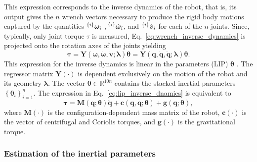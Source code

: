 This expression corresponds to the inverse dynamics of the robot, that is, its output gives the $n$ wrench vectors necessary to produce the rigid body motions captured by the quantities ${}^{\left\lbrace i \right\rbrace}\bm{\omega}_i$ $,{}^{\left\lbrace i \right\rbrace}\dot{\bm{\omega}}_i$, and ${}^{\left\lbrace i \right\rbrace}\dot{\bm{v}}_i$ for each of the $n$ joints. Since, typically, only joint torque $\tau$ is measured, Eq.~\eqref{eq:wrench_inverse_dynamics} is projected onto the rotation axes of the joints \cite{Siciliano2007SpringerHandbookRobotics} yielding
\begin{equation}\label{eq:lip_inverse_dnamics}
\bm{\tau} = \bm{Y}\left(
\bm{\omega},\dot{\bm{\omega}},\dot{\bm{v}}
;\bm{\lambda}\right)\bm{\theta} = \bm{Y}\left(\bm{q},\dot{\bm{q}},\ddot{\bm{q}};\bm{\lambda}\right)\bm{\theta}.
\end{equation}
This expression for the inverse dynamics is linear in the parameters (LIP) $\bm{\theta}$ . The regressor matrix $\bm{Y}\left(\cdot\right)$ is dependent exclusively on the motion of the robot and its geometry $\bm{\lambda}$. The vector $\bm{\theta} \in \mathbb{R}^{10n}$ contains the stacked inertial parameters $\left\lbrace \bm{\theta}_i \right\rbrace^n_{i=1}$. The expression in Eq.~\eqref{eq:lip_inverse_dnamics} is equivalent to
\begin{equation}
	\bm{\tau} = \bm{M}\left(\bm{q};\bm{\theta}\right)\ddot{\bm{q}} + \bm{c}\left(\bm{q},\dot{\bm{q}};\bm{\theta}\right) + \bm{g}\left(\bm{q};\bm{\theta}\right),
\end{equation}
where $\bm{M}(\cdot)$ is the configuration-dependent mass matrix of the robot, $\bm{c}(\cdot)$ is the vector of centrifugal and Coriolis torques, and $\bm{g}(\cdot)$ is the gravitational torque. 

\subsubsection{Estimation of the inertial parameters}

